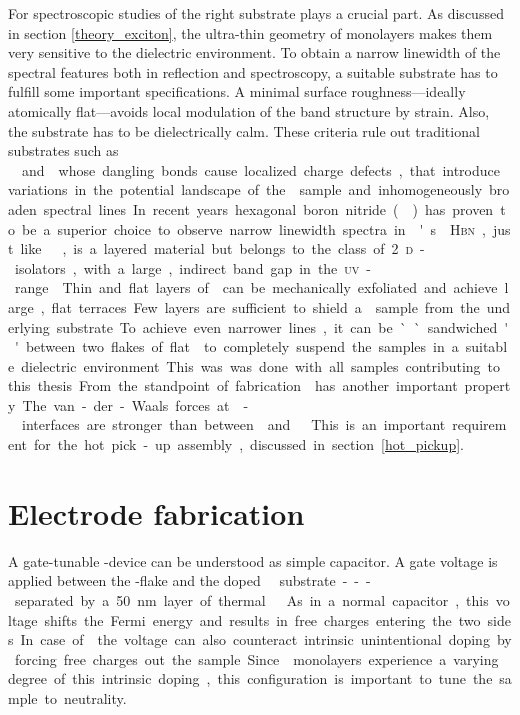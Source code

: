 For spectroscopic studies of \tmds the right substrate plays a crucial part. As discussed in section \ref{theory_exciton}, the ultra-thin geometry of \tmdg monolayers makes them very sensitive to the dielectric environment. To obtain a narrow linewidth of the spectral features both in reflection and \pl spectroscopy, a suitable substrate has to fulfill some important specifications. A minimal surface roughness---ideally atomically flat---avoids local modulation of the band structure by strain. Also, the substrate has to be dielectrically calm. These criteria rule out traditional substrates such as \si\ and \sio whose dangling bonds cause localized charge defects, that introduce variations in the potential landscape of the \tmdg sample and inhomogeneously broaden spectral lines. In recent years hexagonal boron nitride (\hbn) has proven to be a superior choice to observe narrow linewidth spectra in \tmd's \cite{courtade_spectrally_2018}. \textsc{Hbn}, just like \tmds\!, is a layered material but belongs to the class of 2\textsc{d}-isolators, with a large, indirect band gap in the \textsc{uv}-range \cite{arnaud_huge_2006}. Thin and flat layers of \hbng can be mechanically exfoliated and achieve large, flat terraces. Few layers are sufficient to shield a \tmdg sample from the underlying substrate. To achieve even narrower lines, it can be ``sandwiched'' between two flakes of flat \hbng to completely suspend the samples in a suitable dielectric environment. This was was done with all samples contributing to this thesis. From the standpoint of fabrication \hbng has another important property. The van-der-Waals forces at \hbn-\tmdg interfaces are stronger than between \tmds and \sio\!. This is an important requirement for the hot pick-up assembly, discussed in section \ref{hot_pickup}.

\section{Electrode fabrication}

A gate-tunable \tmd-device can be understood as simple capacitor. A gate voltage is applied between the \tmd-flake and the doped \si\ substrate---separated by a 50 nm layer of thermal \sio\!. As in a normal capacitor, this voltage shifts the Fermi energy and results in free charges entering the two sides. In case of \tmds the voltage can also counteract intrinsic unintentional doping by forcing free charges out the sample. Since \tmdg monolayers experience a varying degree of this intrinsic doping, this configuration is important to tune the sample to neutrality.

